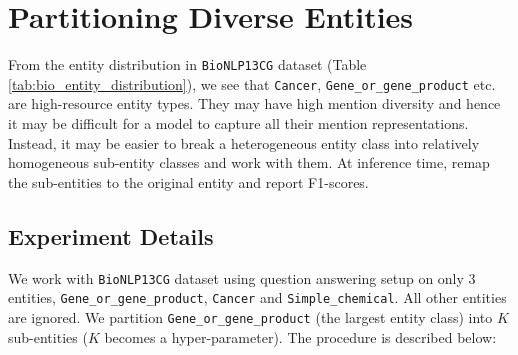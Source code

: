 \section{Partitioning Diverse Entities}
\label{sec:clustering}
From the entity distribution in \texttt{BioNLP13CG} dataset (Table \ref{tab:bio_entity_distribution}), we see that \texttt{Cancer}, \texttt{Gene\_or\_gene\_product} etc. are high-resource entity types. They may have high mention diversity and hence it may be difficult for a model to capture all their mention representations. Instead, it may be easier to break a heterogeneous entity class into relatively homogeneous sub-entity classes and work with them. At inference time, remap the sub-entities to the original entity and report F1-scores.

\subsection{Experiment Details}
We work with \texttt{BioNLP13CG} dataset using question answering setup on only 3 entities, \texttt{Gene\_or\_gene\_product}, \texttt{Cancer} and \texttt{Simple\_chemical}. All other entities are ignored. We partition \texttt{Gene\_or\_gene\_product} (the largest entity class) into $K$ sub-entities ($K$ becomes a hyper-parameter). The procedure is described below:

